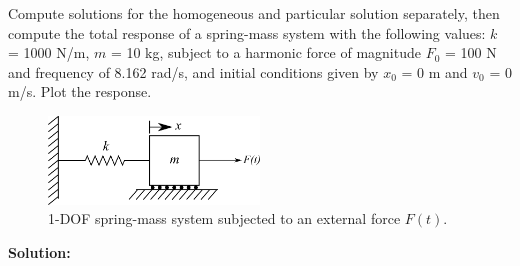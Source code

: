 \documentclass[12pt,letter]{article}
\begin{document}
\begin{example}

	Compute solutions for the homogeneous and particular solution separately, then compute the total response of a spring-mass system with the following values: $k$ = 1000 N/m, $m$ = 10 kg, subject to a harmonic force of magnitude $F_0$ = 100 N and frequency of 8.162 rad/s, and initial conditions given by $x_0$ = 0 m and $v_0$ = 0 m/s. Plot the response.
	
	\begin{figure}[H]
		\centering
		\includegraphics[width=0.5\textwidth]{../figures/1-DOF-spring_mass_horizontal_forced.png}
		\caption{1-DOF spring-mass system subjected to an external force $F(t)$.}
	\end{figure}
	
	\noindent\textbf{Solution:}


\end{example}
\end{document}
